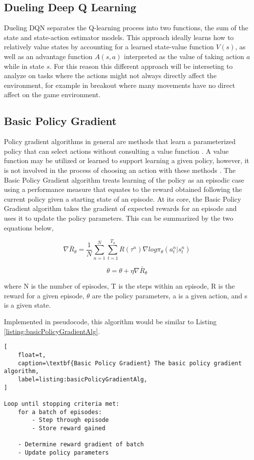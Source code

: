 \documentclass[conference]{IEEEtran}
\begin{document}
\subsection{Dueling Deep Q Learning}
Dueling DQN separates the Q-learning process into two functions, the sum of the state and state-action estimator models. This approach ideally learns how to relatively value states by accounting for a learned state-value function $V(s)$, as well as an advantage function $A(s,a)$ interpreted as the value of taking action $a$ while in state $s$. For this reason this different approach will be interseting to analyze on tasks where the actions might not always directly affect the environment, for example in breakout where many movements have no direct affect on the game environment.

\subsection{Basic Policy Gradient}
Policy gradient algorithms in general are methods that learn a parameterized policy that can select actions without consulting a value function \cite{ReinforcementLearningBook}.
A value function may be utilized or learned to support learning a given policy, however, it is not involved in the process of choosing an action with these methods \cite{ReinforcementLearningBook}.
The Basic Policy Gradient algorithm treats learning of the policy as an episodic case using a performance measure that equates to the reward obtained following the current policy given a starting state of an episode. 
At its core, the Basic Policy Gradient algorithm takes the gradient of expected rewards for an episode and uses it to update the policy parameters.
This can be summarized by the two equations below,

$$\nabla \bar{R}_{\theta} = \frac{1}{N} \sum \limits_{n=1}^N \sum \limits_{t=1}^{T_n} R(\tau^n) \nabla log\pi_{\theta}(a_{t}^n | s_{t}^n)$$

$$\theta = \theta  + \eta \nabla \bar{R}_{\theta}$$

where N is the number of episodes, T is the steps within an episode, R is the reward for a given episode, $\theta$ are the policy parameters, a is a given action, and s is a given state.

Implemented in pseudocode, this algorithm would be similar to Listing \ref{listing:basicPolicyGradientAlg}.

\begin{lstlisting}[
    float=t,
    caption=\textbf{Basic Policy Gradient} The basic policy gradient algorithm,
    label=listing:basicPolicyGradientAlg,
]

Loop until stopping criteria met:
    for a batch of episodes:
        - Step through episode
        - Store reward gained

    - Determine reward gradient of batch
    - Update policy parameters
\end{lstlisting}
\end{document}
